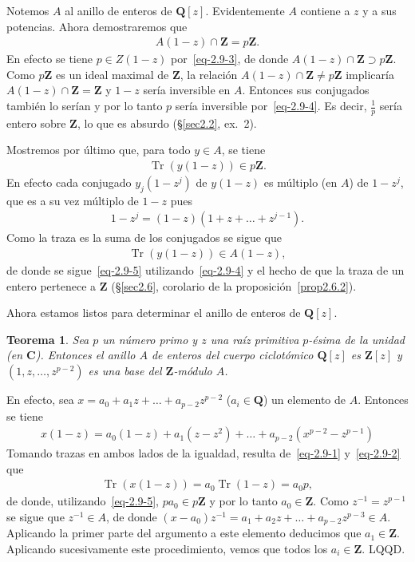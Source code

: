 \documentclass[bibtotoc,leqno,spanish]{amsbook}
\newcommand{\QQ}{\mathbf{Q}}
\newcommand{\ZZ}{\mathbf{Z}}
\newcommand{\CC}{\mathbf{C}}
\newcommand{\QED}{LQQD.}
\DeclareMathOperator{\Tr}{Tr}
\numberwithin{equation}{section}
\theoremstyle{note}
\theoremstyle{note}
\newtheorem{theorem}{Teorema}
\theoremstyle{rem}
\numberwithin{theorem}{section}
\numberwithin{proposition}{section}
\numberwithin{definition}{section}
\numberwithin{lemma}{section}
\numberwithin{corollary}{section}
\numberwithin{example}{section}
\numberwithin{footnote}{section}%
\begin{document}
Notemos $A$ al anillo de enteros de $\QQ[z]$. Evidentemente $A$ contiene a $z$ y a sus potencias. Ahora
demostraremos que
\begin{gather}\label{eq-2.9-4}
A(1-z)\cap\ZZ = p\ZZ.
\end{gather}
En efecto se tiene $p\in Z(1-z)$ por~\eqref{eq-2.9-3}, de donde $A(1-z)\cap\ZZ\supset p\ZZ$. Como $p\ZZ$
es un ideal maximal de $\ZZ$, la relaci\'on $A(1-z)\cap\ZZ\neq p\ZZ$ implicar\'ia $A(1-z)\cap\ZZ=\ZZ$ y
$1-z$ ser\'ia inversible en $A$. Entonces sus conjugados tambi\'en lo ser\'ian y por lo tanto $p$ ser\'ia
inversible por~\eqref{eq-2.9-4}. Es decir, $\frac{1}{p}$ ser\'ia entero sobre $\ZZ$, lo que es absurdo
(\S\ref{sec2.2}, ex.~2).

Mostremos por \'ultimo que, para todo $y\in A$, se tiene
\begin{gather}\label{eq-2.9-5}
\Tr(y(1-z))\in p\ZZ.
\end{gather}
En efecto cada conjugado $y_{j}(1-z^{j})$ de $y(1-z)$ es m\'ultiplo (en $A$) de $1-z^{j}$, que es a su
vez m\'ultiplo de $1-z$ pues
\begin{gather*}
1-z^{j} = (1-z)(1+z+\dots+z^{j-1}).
\end{gather*}
Como la traza es la suma de los conjugados se sigue que
\begin{gather*}
\Tr(y(1-z))\in A(1-z),
\end{gather*}
de donde se sigue~\eqref{eq-2.9-5} utilizando~\eqref{eq-2.9-4} y el hecho de que la traza de un entero
pertenece a $\ZZ$ (\S\ref{sec2.6}, corolario de la proposici\'on~\ref{prop2.6.2}).

Ahora estamos listos para determinar el anillo de enteros de $\QQ[z]$.

\begin{theorem}\label{teo2.9.2}
Sea $p$ un n\'umero primo y $z$ una ra\'iz primitiva $p$-\'esima de la unidad (en $\CC$). Entonces el
anillo $A$ de enteros del cuerpo ciclot\'omico $\QQ[z]$ es $\ZZ[z]$ y $(1,z,\dots,z^{p-2})$ es una base
del $\ZZ$-m\'odulo $A$.
\end{theorem}

En efecto, sea $x = a_{0}+a_{1}z+\dots+a_{p-2}z^{p-2}$ ($a_{i}\in\QQ$) un elemento de $A$. Entonces
se tiene
\begin{gather*}
x(1-z) = a_{0}(1-z)+a_{1}(z-z^{2})+\dots+a_{p-2}(x^{p-2}-z^{p-1})
\end{gather*}
Tomando trazas en ambos lados de la igualdad, resulta de~\eqref{eq-2.9-1} y~\eqref{eq-2.9-2} que
\begin{gather*}
\Tr(x(1-z)) = a_{0}\Tr(1-z)=a_{0}p,
\end{gather*}
de donde, utilizando~\eqref{eq-2.9-5}, $pa_{0}\in p\ZZ$ y por lo tanto $a_{0}\in\ZZ$. Como
$z^{-1}=z^{p-1}$ se sigue que $z^{-1}\in A$, de donde $(x-a_{0})z^{-1}=a_{1}+a_{2}z+\dots+a_{p-2}z^{p-3}\in A$.
Aplicando la primer parte del argumento a este elemento deducimos que $a_{1}\in\ZZ$. Aplicando sucesivamente
este procedimiento, vemos que todos los $a_{i}\in\ZZ$. \QED
\end{document}
